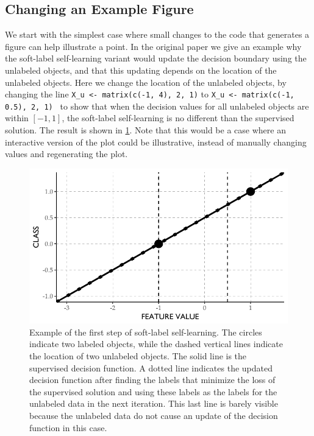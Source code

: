 \documentclass[twoside]{memoir}\usepackage[]{graphicx}\usepackage{xcolor}
\makeatletter
\def\maxwidth{ %
  \ifdim\Gin@nat@width>\linewidth
    \linewidth
  \else
    \Gin@nat@width
  \fi
}
\newenvironment{knitrout}{}{} %
\newcommand{\inlinecode}{\texttt}
\makeatother
\begin{document}
\subsection{Changing an Example Figure}
We start with the simplest case where small changes to the code that generates a figure can help illustrate a point. In the original paper we give an example why the soft-label self-learning variant would update the decision boundary using the unlabeled objects, and that this updating depends on the location of the unlabeled objects. Here we change the location of the unlabeled objects, by changing the line \inlinecode{X\_u <-  matrix(c(-1, 4), 2, 1)} to \inlinecode{X\_u <-  matrix(c(-1, 0.5), 2, 1) } to show that when the decision values for all unlabeled objects are within $[-1,1]$, the soft-label self-learning is no different than the supervised solution. The result is shown in \cref{fig:additional-simple-example}. Note that this would be a case where an interactive version of the plot could be illustrative, instead of manually changing values and regenerating the plot.

\begin{knitrout}
\color{fgcolor}\begin{figure}
\includegraphics[width=\maxwidth]{figure/additional-simple-example-1} \caption[Example of the first step of soft-label self-learning]{Example of the first step of soft-label self-learning. The circles indicate two labeled objects, while the dashed vertical lines indicate the location of two unlabeled objects. The solid line is the supervised decision function. A dotted line indicates the updated decision function after finding the labels that minimize the loss of the supervised solution and using these labels as the labels for the unlabeled data in the next iteration. This last line is barely visible because the unlabeled data do not cause an update of the decision function in this case.}\label{fig:additional-simple-example}
\end{figure}


\end{knitrout}
\end{document}
